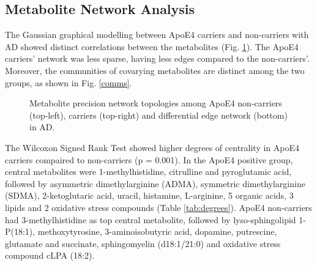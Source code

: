 \documentclass{amsart}
\begin{document}
\subsection{Metabolite Network Analysis}
The Gaussian graphical modelling between ApoE4 carriers and non-carriers with AD showed distinct correlations between the metabolites (Fig. \ref{netAD}). The ApoE4 carriers' network was less sparse, having less edges compared to the non-carriers'. Moreover, the communities of covarying metabolites are distinct among the two groups, as shown in Fig. \ref{comms}.
\begin{figure}[!hb]
\centerline{}
\caption{\label{netAD} Metabolite precision network topologies among ApoE4 non-carriers (top-left), carriers (top-right) and differential edge network (bottom) in AD.}  
\end{figure}

The Wilcoxon Signed Rank Test showed higher degrees of centrality in ApoE4 carriers compaired to non-carriers (p = 0.001). In the ApoE4 positive group, central metabolites were 1-methylhistidine, citrulline and pyroglutamic acid, followed by asymmetric dimethylarginine (ADMA), symmetric dimethylarginine (SDMA), 2-ketoglutaric acid, uracil, histamine, L-arginine, 5 organic acids, 3 lipids and 2 oxidative stress compounds (Table \ref{tab:degrees}). ApoE4 non-carriers had 3-methylhistidine as top central metabolite, followed by lyso-sphingolipid 1-P(18:1), methoxytyrosine, 3-aminoisobutyric acid, dopamine, putrescine, glutamate and succinate, sphingomyelin (d18:1/21:0) and oxidative stress compound cLPA (18:2).
\end{document}
